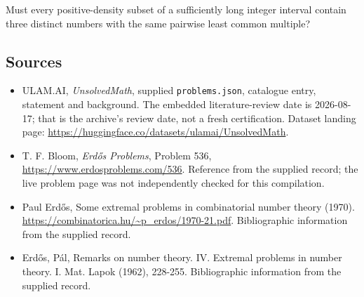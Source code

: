 \documentclass[11pt,a4paper]{article}
\begin{document}
Must every positive-density subset of a sufficiently long integer interval contain three distinct numbers with the same pairwise least common multiple?

\subsection{Sources}

{\small

\begin{itemize}

\item[\hypertarget{source:statement:1}{S1}] ULAM.AI, \emph{UnsolvedMath}, supplied \texttt{problems.json}, catalogue entry, statement and background. The embedded literature-review date is 2026-08-17; that is the archive’s review date, not a fresh certification. Dataset landing page: \url{https://huggingface.co/datasets/ulamai/UnsolvedMath}.

\item[\hypertarget{source:statement:2}{S2}] T. F. Bloom, \emph{Erdős Problems}, Problem 536, \url{https://www.erdosproblems.com/536}. Reference from the supplied record; the live problem page was not independently checked for this compilation.

\item[\hypertarget{source:statement:3}{S3}] Paul Erdős, Some extremal problems in combinatorial number theory (1970). \url{https://combinatorica.hu/~p_erdos/1970-21.pdf}. Bibliographic information from the supplied record.

\item[\hypertarget{source:statement:4}{S4}] Erd\H{o}s, P\'{a}l, Remarks on number theory. IV. Extremal problems in number theory. I. Mat. Lapok (1962), 228-255. Bibliographic information from the supplied record.

\end{itemize}

}

\label{end:statement}
\end{document}

